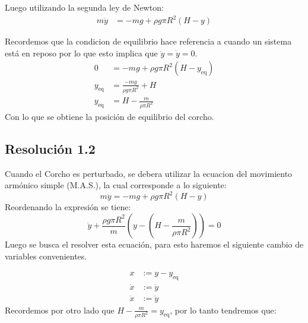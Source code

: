 \documentclass[
  11pt,
  letterpaper,
   addpoints,
   answers
  ]{exam}
\begin{document}
\begin{questions}
\begin{solution}
Luego utilizando la segunda ley de Newton:
\begin{align}
m\ddot{y} &= -mg + \rho g \pi R^2 (H - y)
\end{align}

Recordemos que la condicion de equilibrio hace referencia a cuando un sistema está en reposo por lo que esto implica que $\ddot{y} = \dot{y} = 0$.
\begin{align}
0 &= -mg + \rho g \pi R^2 (H - y_{\mathrm{eq}})\\
y_{\mathrm{eq}} &= \frac{-mg}{\rho g \pi R^2} + H\\
y_{\mathrm{eq}} &= H - \frac{m}{\rho \pi R^2}
\end{align}
Con lo que se obtiene la posición de equilibrio del corcho.
\subsection*{Resolución 1.2}

Cuando el Corcho es perturbado, se debera utilizar la ecuacion del movimiento armónico simple (M.A.S.), la cual corresponde a lo siguiente:
\begin{equation}
m\ddot{y} = -mg + \rho g \pi R^2 (H - y)
\end{equation}
Reordenando la expresión se tiene:
\begin{equation}
\ddot{y} + \frac{\rho g \pi R^2}{m} \left( y - \left( H - \frac{m}{\rho \pi R^2} \right) \right) = 0
\end{equation}
Luego se busca el resolver esta ecuación, para esto haremos el siguiente cambio de variables convenientes.

\begin{align}
    x &:= y - y_{\mathrm{eq}} \\
\dot{x} &:= \dot{y} \\
\ddot{x} &:= \ddot{y}
\end{align}
Recordemos por otro lado que $H - \frac{m}{\rho \pi R^2} = y_{\mathrm{eq}}$, por lo tanto tendremos que:


\end{solution}
\end{questions}
\end{document}

